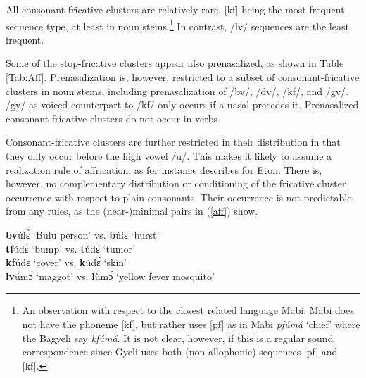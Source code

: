 All consonant-fricative clusters are relatively rare, [kf] being the most frequent sequence type, at least in noun stems.\footnote{An observation with respect to the closest related language Mabi: Mabi does not have the phoneme [kf], but rather uses [pf] as in Mabi {\itshape pfúmá} `chief' where the Bagyeli say {\itshape kfúmá}. It is not clear, however, if this is a regular sound correspondence since Gyeli uses both (non-allophonic) sequences [pf] and [kf].} In contrast, /lv/ sequences are the least frequent.


Some of the stop-fricative clusters appear also prenasalized, as shown in Table \ref{Tab:Aff}. Prenasalization is, however, restricted to a subset of consonant-fricative clusters in noun stems, including prenasalization of /bv/, /dv/, /kf/, and /gv/. /gv/ as voiced counterpart to /kf/ only occurs if a nasal precedes it. Prenasalized consonant-fricative clusters do not occur in verbs.


Consonant-fricative clusters are further restricted in their distribution in that they only occur before the high vowel /u/.  This makes it likely to assume a realization rule of affrication, as for instance \citet[26]{velde2008} describes for Eton. There is, however, no complementary distribution or conditioning of the fricative cluster occurrence with respect to plain consonants. Their occurrence is not predictable from any rules, as the (near-)minimal pairs in (\ref{aff}) show. 

\begin{exe} \ex \label{aff}
{\bfseries bv}úlɛ̀ `Bulu person' vs. {\bfseries b}úlɛ `burst' \\
{\bfseries tf}údɛ́ `bump' vs. {\bfseries t}údɛ̀ `tumor' \\
{\bfseries kf}údɛ `cover' vs. {\bfseries k}údɛ́ `skin' \\
{\bfseries lv}úmɔ́ `maggot' vs. {\bfseries l}ùmɔ́ `yellow fever mosquito' 
\end{exe}

